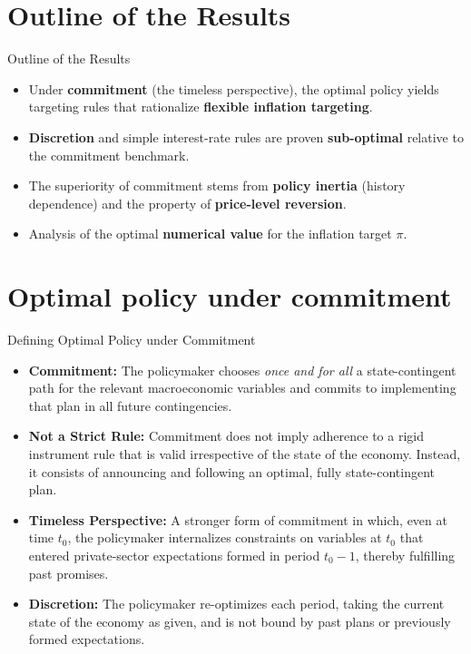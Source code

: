 \documentclass[11pt,aspectratio=169]{beamer}
\begin{document}
\section{Outline of the Results}
\begin{frame}{Outline of the Results}
\small

\begin{itemize}
    \item Under \textbf{commitment} (the timeless perspective), the optimal policy yields targeting rules that rationalize \textbf{flexible inflation targeting}.
    \item \textbf{Discretion} and simple interest-rate rules are proven \textbf{sub-optimal} relative to the commitment benchmark.
    \item The superiority of commitment stems from \textbf{policy inertia} (history dependence) and the property of \textbf{price-level reversion}.
    \item Analysis of the optimal \textbf{numerical value} for the inflation target $\pi$.
\end{itemize}

\end{frame}

\section{Optimal policy under commitment}

\begin{frame}{Defining Optimal Policy under Commitment}
\small

\begin{itemize}
  \item \textbf{Commitment:} The policymaker chooses \emph{once and for all} a state-contingent path for the relevant macroeconomic variables and commits to implementing that plan in all future contingencies.

  \item \textbf{Not a Strict Rule:} Commitment does not imply adherence to a rigid instrument rule that is valid irrespective of the state of the economy. Instead, it consists of announcing and following an optimal, fully state-contingent plan.

  \item \textbf{Timeless Perspective:} A stronger form of commitment in which, even at time $t_{0}$, the policymaker internalizes constraints on variables at $t_{0}$ that entered private-sector expectations formed in period $t_{0}-1$, thereby fulfilling past promises.

  \item \textbf{Discretion:} The policymaker re-optimizes each period, taking the current state of the economy as given, and is not bound by past plans or previously formed expectations.
\end{itemize}

\end{frame}
\end{document}
